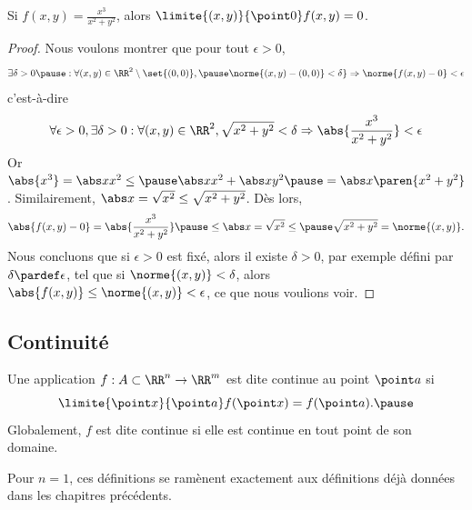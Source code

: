 \begin{frame}
\begin{example}
  Si \(f(x,y) = \frac{x^{3}}{x^{2}+y^{2}}\), alors \(\limite {(x,y)} {\point 0} f(x,y) = 0\).\pause{}
  \begin{proof}
    Nous voulons montrer que pour tout \(\epsilon > 0\),
    \begin{equation*}
    \exists \delta > 0\pause : \forall (x,y) \in \RR^{2}\setminus\set{(0,0)},\pause \norme{(x,y) - (0,0)} < \delta\} \Rightarrow \norme{f(x,y) - 0} < \epsilon
    \end{equation*}\pause{}
    c'est-à-dire
    \begin{equation*}
      \forall \epsilon > 0, \exists \delta > 0 : \forall (x,y) \in \RR^{2}, \sqrt{x^{2} + y^{2}} < \delta \Rightarrow \abs{\frac{x^{3}}{x^{2}+y^{2}}} < \epsilon
    \end{equation*}\pause{}
    Or \(\abs{x^{3}} = \abs x x^{2} \leq\pause \abs x x^{2} +\abs x y^{2}\pause = \abs x \paren{x^{2} + y^{2}}\).\pause{}
    Similairement,\pause{} \(\abs x = \sqrt {x^{2}} \leq \sqrt{x^{2}+y^{2}}\). Dès lors,\pause{}
    \begin{equation*}
      \abs{f(x,y) - 0} = \abs{\frac{x^{3}}{x^{2}+y^{2}}}\pause \leq \abs x = \sqrt{x^{2}} \leq\pause \sqrt{x^{2} + y^{2}} = \norme{ (x,y) }.
    \end{equation*}
    Nous concluons que si \(\epsilon > 0\) est fixé, alors il existe \(\delta > 0\),\pause{} par exemple défini par \(\delta \pardef \epsilon\),\pause{} tel que si \(\norme{(x,y)} < \delta\),\pause{} alors \(\abs{f(x,y)} \leq \norme{(x,y)} < \epsilon\)\pause{}, ce que nous voulions voir.
  \end{proof}
\end{example}
\end{frame}

\subsection{Continuité}
\begin{frame}
  \begin{definition}
    Une application \(f : A \subset \RR^{n} \to \RR^{m}\) est dite continue au point $\point a$ si\pause{}
    \begin{equation*}
      \limite {\point x}{\point a} f(\point x)=f(\point a).\pause
    \end{equation*}
    Globalement, \(f\) est dite continue si elle est continue en tout point de son domaine.
  \end{definition}\pause{}

  \begin{remark*}
    Pour \(n = 1\), ces définitions se ramènent exactement aux définitions déjà données dans les chapitres précédents.
  \end{remark*}
\end{frame}

